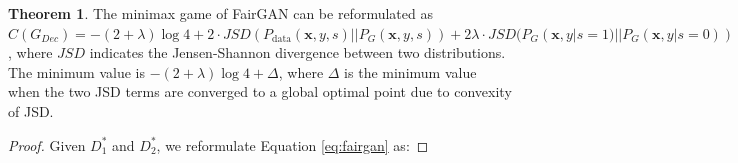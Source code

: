 \documentclass[sigconf]{acmart}
\theoremstyle{definition}
\newtheorem{theorem}{Theorem}
\begin{document}
\begin{theorem}
The minimax game of FairGAN can be reformulated as $C(G_{Dec})=-(2+\lambda) \log4 + 2 \cdot JSD(P_{\text{data}}(\mathbf{x},y,s)||P_{G}(\mathbf{x},y,s))+2 \lambda \cdot JSD(P_{G}(\mathbf{x},y|s=1)||P_{G}(\mathbf{x},y|s=0))$, where $JSD$ indicates the Jensen-Shannon divergence between two distributions. The minimum value is $-(2+\lambda) \log4 + \Delta$, where $\Delta$ is the minimum value when the two JSD terms are converged to a global optimal point due to convexity of JSD.
\end{theorem}

\begin{proof}
Given $D_1^*$ and $D_2^*$, we reformulate Equation \ref{eq:fairgan} as:

\resizebox{.98\linewidth}{!}{
\begin{minipage}{\linewidth}
\begin{equation}
\begin{split}
\label{eq:maxd}

\end{split}
\end{equation}
\end{minipage}}
\end{proof}
\end{document}
